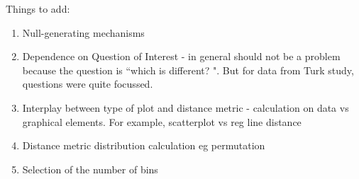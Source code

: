 \documentclass[12]{article}
\newcommand{\red}[1]{{\color{red} #1}}
\begin{document}


%
%
%


{\color{red} Things to add:
\begin{enumerate}
\item Null-generating mechanisms 
\item Dependence on Question of Interest - in general should not be a problem because the question is ``which is different? ". But for data from Turk study, questions were quite focussed.
\item Interplay between type of plot and distance metric - calculation on data vs graphical elements. For example, scatterplot vs reg line distance
\item Distance metric distribution calculation eg permutation
\item Selection of the number of bins
\end{enumerate}}
\end{document}
